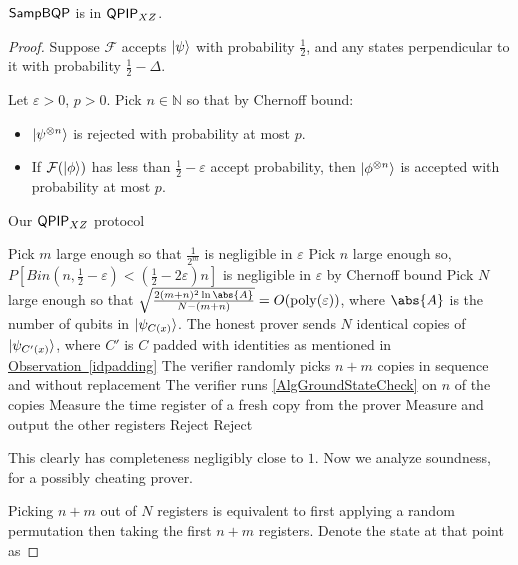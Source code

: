 \begin{theorem}
	$\operatorname{\mathsf{SampBQP}}$ is in $\operatorname{\mathsf{QPIP}}_{XZ}$.
\end{theorem}
\begin{proof}

	Suppose $\mathcal{F}$ accepts $\ket{\psi}$ with probability $\frac{1}{2}$, and any states perpendicular to it with probability $\frac{1}{2}-\Delta$.

	Let $\varepsilon>0$, $p>0$. Pick $n\in\mathbb{N}$ so that by Chernoff bound:
	\begin{itemize}
		\item $\ket{\psi^{\otimes n}}$ is rejected with probability at most $p$.
		\item If $\mathcal{F}(\ket{\phi})$ has less than $\frac{1}{2}-\varepsilon$ accept probability, then $\ket{\phi^{\otimes n}}$ is accepted with probability at most $p$.
	\end{itemize}

	\begin{algorithm}
		\caption{Our $\operatorname{\mathsf{QPIP}}_{XZ}$ protocol}
		\label{AlgAmp1}
		\begin{algorithmic}[1]
			\State Pick $m$ large enough so that $\frac{1}{2^m}$ is negligible in $\varepsilon$
			\State Pick $n$ large enough so, $P\left[Bin(n, \frac{1}{2}-\varepsilon)<\left(\frac{1}{2}-2\varepsilon\right)n\right]$ is negligible in $\varepsilon$ by Chernoff bound
			\State Pick $N$ large enough so that $\sqrt{\frac{2(m+n)^2\ln\abs{A}}{N-(m+n)}}=O(\poly(\varepsilon))$, where $\abs{A}$ is the number of qubits in $\ket{\psi_{C(x)}}$.
			\State The honest prover sends $N$ identical copies of $\ket{\psi_{C'(x)}}$, where $C'$ is $C$ padded with identities as mentioned in \hyperref[idpadding]{Observation~\ref*{idpadding}}
			\State The verifier randomly picks $n+m$ copies in sequence and without replacement
			\State The verifier runs \autoref{AlgGroundStateCheck} on $n$ of the copies
				\State Measure the time register of a fresh copy from the prover
					\State Measure and output the other registers
				\EndIf
			\EndFor
			\State Reject
			\Else
			\State Reject
			\EndIf
		\end{algorithmic}
	\end{algorithm}

	This clearly has completeness negligibly close to $1$. Now we analyze soundness, for a possibly cheating prover.

	Picking $n+m$ out of $N$ registers is equivalent to first applying a random permutation then taking the first $n+m$ registers. Denote the state at that point as


\end{proof}
